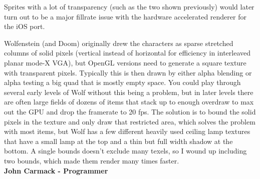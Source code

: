 \par

 Sprites with a lot of transparency (such as the two shown previously) would later turn out to be a major fillrate issue with the hardware accelerated renderer for the iOS port.\\
\par
\begin{fancyquotes}
Wolfenstein (and Doom) originally drew the characters as sparse stretched columns of solid pixels (vertical instead of horizontal for efficiency in interleaved planar mode-X VGA), but OpenGL versions need to generate a square texture with transparent pixels.  Typically this is then drawn by either alpha blending or alpha testing a big quad that is mostly empty space.  You could play through several early levels of Wolf without this being a problem, but in later levels there are often large fields of dozens of items that stack up to enough overdraw to max out the GPU and drop the framerate to 20 fps.  The solution is to bound the solid pixels in the texture and only draw that restricted area, which solves the problem with most items, but Wolf has a few different heavily used ceiling lamp textures that have a small lamp at the top and a thin but full width shadow at the bottom.  A single bounds doesn't exclude many texels, so I wound up including two bounds, which made them render many times faster. 
\bigskip \\
\textbf{John Carmack - Programmer}
 \end{fancyquotes}

\par












